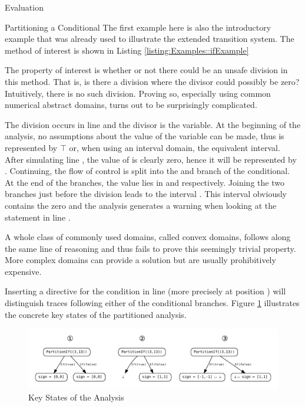 \begin{chapter}{Evaluation}

	\begin{section}{Partitioning a Conditional}
		The first example here is also the introductory example that was already used to illustrate the extended transition system. The method of interest is shown in Listing \ref{listing:Examples::ifExample}
	
		

		The property of interest is whether or not there could be an unsafe division in this method. That is, is there a division where the divisor could possibly be zero? Intuitively, there is no such division. Proving so, especially using common numerical abstract domains, turns out to be surprisingly complicated.

		The division occurs in line  and the divisor is the  variable. At the beginning of the analysis, no assumptions about the value of the variable can be made, thus  is represented by $\top$ or, when using an interval domain, the equivalent  interval. After simulating line , the value of  is clearly zero, hence it will be represented by \code{[0,0]}. Continuing, the flow of control is split into the  and  branch of the conditional. At the end of the branches, the value lies in \code{[-1,-1]} and \code{[1,1]} respectively. Joining the two branches just before the division leads to the interval \code{[-1,-1] $\sqcup$ [1,1] = [-1,1]}. This interval obviously contains the zero and the analysis generates a warning when looking at the statement in line .

		A whole class of commonly used domains, called convex domains, follows along the same line of reasoning and thus fails to prove this seemingly trivial property. More complex domains can provide a solution but are usually prohibitively expensive.

		Inserting a  directive for the condition in line  (more precisely at position ) will distinguish traces following either of the conditional branches. Figure \ref{figure:PartitionIfExample} illustrates the concrete key states of the partitioned analysis.

		\begin{figure}
			\centering
			\includegraphics[width=\textwidth]{Graphs/PartitionIfExample.pdf}
			\caption{Key States of the Analysis}
			\label{figure:PartitionIfExample}
		\end{figure}


\end{section}
\end{chapter}
